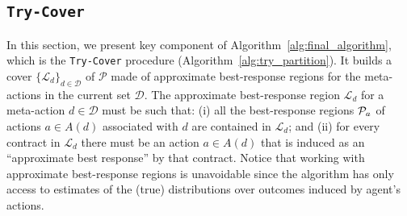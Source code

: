 \subsection{\texttt{Try-Cover}}\label{sec:try_partition}
In this section, we present key component of Algorithm~\ref{alg:final_algorithm}, which is
the \texttt{Try-Cover} procedure (Algorithm~\ref{alg:try_partition}). 
%
It builds a cover $\{\mathcal{L}_{d}\}_{d\in  \mathcal{D}}$ of $\mathcal{P}$ made of approximate best-response regions for the meta-actions in the current set $\mathcal{D}$.
%
The approximate best-response region $\mathcal{L}_d$ for a meta-action $d \in \mathcal{D}$ must be such that: (i) all the best-response regions $\mathcal{P}_a$ of actions $a \in A(d)$ associated with $d$ are contained in $\mathcal{L}_d$; and (ii) for every contract in $\mathcal{L}_d$ there must be an action $a \in A(d)$ that is induced as an ``approximate best response'' by that contract.
%
Notice that working with approximate best-response regions is unavoidable since the algorithm has only access to estimates of the (true) distributions over outcomes induced by agent's actions.  



